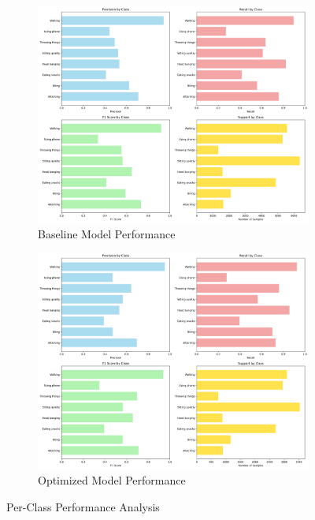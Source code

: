 \documentclass[a4paper,11pt]{article}
\begin{document}
\begin{figure}[H]
\centering
\begin{subfigure}{0.48\textwidth}
    \centering
    \includegraphics[width=\textwidth]{results/metrics/baseline/class_performance.png}
    \caption{Baseline Model Performance}
    \label{fig:baseline_class}
\end{subfigure}
\hfill
\begin{subfigure}{0.48\textwidth}
    \centering
    \includegraphics[width=\textwidth]{results/metrics/optimized/class_performance.png}
    \caption{Optimized Model Performance}
    \label{fig:optimized_class}
\end{subfigure}
\caption{Per-Class Performance Analysis}
\label{fig:class_performance}
\end{figure}
\end{document}
